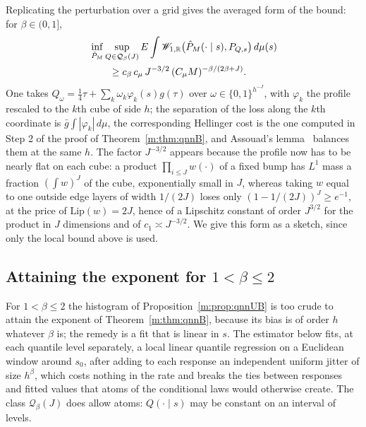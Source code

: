 \begin{remark}\label{m:rem:assouad}
Replicating the perturbation over a grid gives the averaged form of the bound: for $\beta\in(0,1]$,
\[
\begin{aligned}
&\inf_{\hat P_M}\sup_{Q\in\mathcal Q_\beta(J)}E\int\mathscr{W}_{1,\mathbb{R}}\big(\hat P_M(\cdot\mid s),P_{Q,s}\big)\,d\mu(s)\\
&\qquad\ge c_\beta\,c_\mu\,J^{-3/2}\,(C_\mu M)^{-\beta/(2\beta+J)} .
\end{aligned}
\]
One takes $Q_\omega=\frac14\tau+\sum_k\omega_k\varphi_k(s)g(\tau)$ over $\omega\in\{0,1\}^{h^{-J}}$, with $\varphi_k$ the profile rescaled to the $k$th cube of side $h$; the separation of the loss along the $k$th coordinate is $\bar g\int|\varphi_k|\,d\mu$, the corresponding Hellinger cost is the one computed in Step 2 of the proof of Theorem~\ref{m:thm:qnnB}, and Assouad's lemma~\cite[Section~2.7.2]{tsybakov2009} balances them at the same $h$. The factor $J^{-3/2}$ appears because the profile now has to be nearly flat on each cube: a product $\prod_{i\le J}w(\cdot)$ of a fixed bump has $L^1$ mass a fraction $(\int w)^J$ of the cube, exponentially small in $J$, whereas taking $w$ equal to one outside edge layers of width $1/(2J)$ loses only $(1-1/(2J))^J\ge e^{-1}$, at the price of $\mathrm{Lip}(w)=2J$, hence of a Lipschitz constant of order $J^{3/2}$ for the product in $J$ dimensions and of $c_1\asymp J^{-3/2}$. We give this form as a sketch, since only the local bound above is used.
\end{remark}

\subsection{Attaining the exponent for \texorpdfstring{$1<\beta\le2$}{1 < beta <= 2}}

For $1<\beta\le2$ the histogram of Proposition~\ref{m:prop:qnnUB} is too crude to attain the exponent of Theorem~\ref{m:thm:qnnB}, because its bias is of order $h$ whatever $\beta$ is; the remedy is a fit that is linear in $s$. The estimator below fits, at each quantile level separately, a local linear quantile regression on a Euclidean window around $s_0$, after adding to each response an independent uniform jitter of size $h^\beta$, which costs nothing in the rate and breaks the ties between responses and fitted values that atoms of the conditional laws would otherwise create. The class $\mathcal Q_\beta(J)$ does allow atoms: $Q(\cdot\mid s)$ may be constant on an interval of levels.

